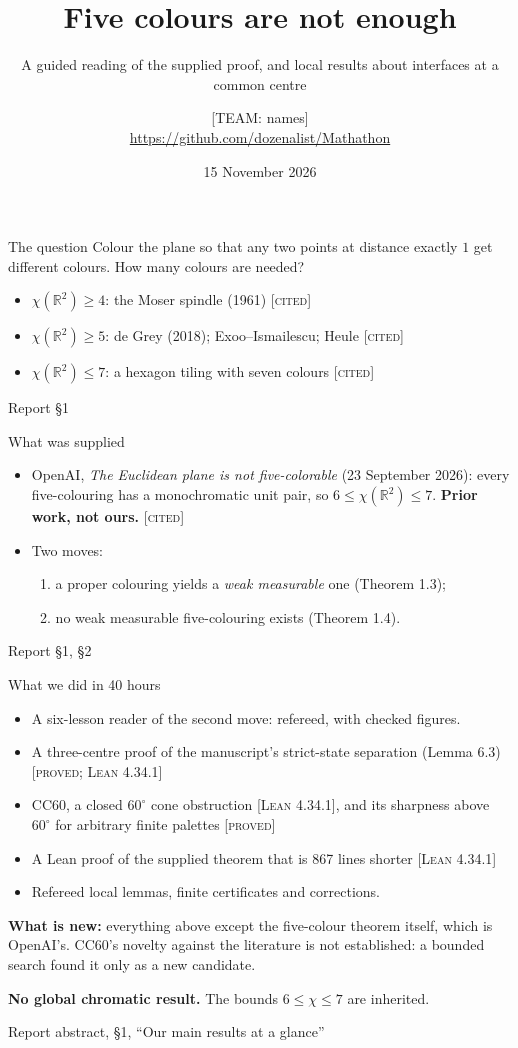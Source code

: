 \documentclass[aspectratio=169,11pt]{beamer}
\title{Five colours are not enough}
\subtitle{A guided reading of the supplied proof, and local results about interfaces at a common centre}
\author{[TEAM: names]\\[2pt]{\footnotesize\url{https://github.com/dozenalist/Mathathon}}}
\date{15 November 2026}
\newcommand{\R}{\mathbb{R}}
\newcommand{\st}[1]{{\footnotesize\textsc{[#1]}}}
\newcommand{\src}[1]{\par\vfill{\scriptsize\color{gray} Report #1}}
\begin{document}
\frame{\titlepage}

\begin{frame}{The question}
Colour the plane so that any two points at distance exactly $1$ get different colours. How many colours are needed?
\begin{itemize}
\item $\chi(\R^2)\ge4$: the Moser spindle (1961) \st{cited}
\item $\chi(\R^2)\ge5$: de Grey (2018); Exoo--Ismailescu; Heule \st{cited}
\item $\chi(\R^2)\le7$: a hexagon tiling with seven colours \st{cited}
\end{itemize}
\src{\S1}
\end{frame}

\begin{frame}{What was supplied}
\begin{itemize}
\item OpenAI, \emph{The Euclidean plane is not five-colorable} (23 September 2026): every five-colouring has a monochromatic unit pair, so $6\le\chi(\R^2)\le7$. \textbf{Prior work, not ours.} \st{cited}
\item Two moves:
  \begin{enumerate}
  \item a proper colouring yields a \emph{weak measurable} one (Theorem 1.3);
  \item no weak measurable five-colouring exists (Theorem 1.4).
  \end{enumerate}
\end{itemize}
\src{\S1, \S2}
\end{frame}

\begin{frame}{What we did in 40 hours}
\begin{itemize}
\item A six-lesson reader of the second move: refereed, with checked figures.
\item A three-centre proof of the manuscript's strict-state separation (Lemma 6.3) \st{proved; Lean 4.34.1}
\item CC60, a closed $60^\circ$ cone obstruction \st{Lean 4.34.1}, and its sharpness above $60^\circ$ for arbitrary finite palettes \st{proved}
\item A Lean proof of the supplied theorem that is 867 lines shorter \st{Lean 4.34.1}
\item Refereed local lemmas, finite certificates and corrections.
\end{itemize}
\medskip
\textbf{What is new:} everything above except the five-colour theorem itself, which is OpenAI's. CC60's novelty against the literature is not established: a bounded search found it only as a new candidate.
\smallskip

\textbf{No global chromatic result.} The bounds $6\le\chi\le7$ are inherited.
\src{abstract, \S1, ``Our main results at a glance''}
\end{frame}
\end{document}
